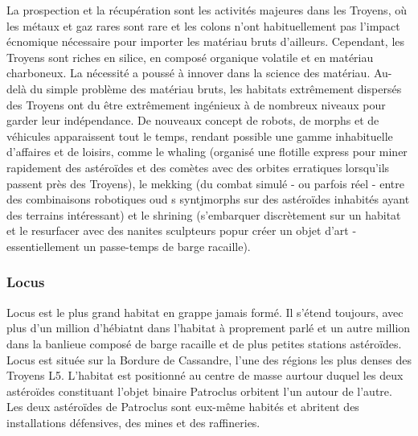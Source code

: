                                                                La prospection et la récupération sont les activités majeures dans les Troyens, où les métaux et gaz rares sont rare et les colons n'ont habituellement pas l'impact écnomique nécessaire pour importer les matériau bruts d'ailleurs. Cependant, les Troyens sont riches en silice, en composé organique volatile et en matériau charboneux. La nécessité a poussé à innover dans la science des matériau. Au-delà du simple problème des matériau bruts, les habitats extrêmement dispersés des Troyens ont du être extrêmement ingénieux à de nombreux niveaux pour garder leur indépendance. De nouveaux concept de robots, de morphs et de véhicules apparaissent tout le temps, rendant possible une gamme inhabituelle d'affaires et de loisirs, comme le whaling (organisé une flotille express pour miner rapidement des astéroïdes et des comètes avec des orbites erratiques lorsqu'ils passent près des Troyens), le mekking (du combat simulé - ou parfois réel - entre des combinaisons robotiques oud s syntjmorphs sur des astéroïdes inhabités ayant des terrains intéressant) et le shrining (s'embarquer discrètement sur un habitat et le resurfacer avec des nanites sculpteurs popur créer un objet d'art - essentiellement un passe-temps de barge racaille). 

                                                               \subsubsection{Locus} \label{sec:locus} 

                                                               Locus est le plus grand habitat en grappe jamais formé. Il s'étend toujours, avec plus d'un million d'hébiatnt dans l'habitat à proprement parlé et un autre million dans la banlieue composé de barge racaille et de plus petites stations astéroïdes. Locus est située sur la Bordure de Cassandre, l'une des régions les plus denses des Troyens L5. L'habitat est positionné au centre de masse aurtour duquel les deux astéroïdes constituant l'objet binaire Patroclus orbitent l'un autour de l'autre. Les deux astéroïdes de Patroclus sont eux-même habités et abritent des installations défensives, des mines et des raffineries. 

